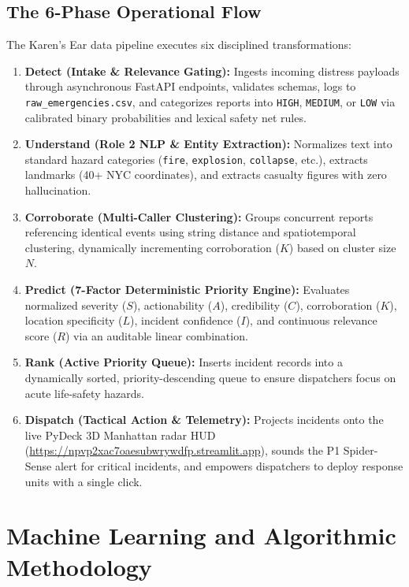 \documentclass[10pt,a4paper]{article}
\begin{document}
\subsection{The 6-Phase Operational Flow}
The Karen's Ear data pipeline executes six disciplined transformations:
\begin{enumerate}
  \item \textbf{Detect (Intake \& Relevance Gating):} Ingests incoming distress payloads through asynchronous FastAPI endpoints, validates schemas, logs to \texttt{raw\_emergencies.csv}, and categorizes reports into \texttt{HIGH}, \texttt{MEDIUM}, or \texttt{LOW} via calibrated binary probabilities and lexical safety net rules.
  \item \textbf{Understand (Role 2 NLP \& Entity Extraction):} Normalizes text into standard hazard categories (\texttt{fire}, \texttt{explosion}, \texttt{collapse}, etc.), extracts landmarks (40+ NYC coordinates), and extracts casualty figures with zero hallucination.
  \item \textbf{Corroborate (Multi-Caller Clustering):} Groups concurrent reports referencing identical events using string distance and spatiotemporal clustering, dynamically incrementing corroboration ($K$) based on cluster size $N$.
  \item \textbf{Predict (7-Factor Deterministic Priority Engine):} Evaluates normalized severity ($S$), actionability ($A$), credibility ($C$), corroboration ($K$), location specificity ($L$), incident confidence ($I$), and continuous relevance score ($R$) via an auditable linear combination.
  \item \textbf{Rank (Active Priority Queue):} Inserts incident records into a dynamically sorted, priority-descending queue to ensure dispatchers focus on acute life-safety hazards.
  \item \textbf{Dispatch (Tactical Action \& Telemetry):} Projects incidents onto the live PyDeck 3D Manhattan radar HUD (\url{https://npvp2xac7oaesubwrywdfp.streamlit.app}), sounds the P1 Spider-Sense alert for critical incidents, and empowers dispatchers to deploy response units with a single click.
\end{enumerate}

\section{Machine Learning and Algorithmic Methodology}
\end{document}
